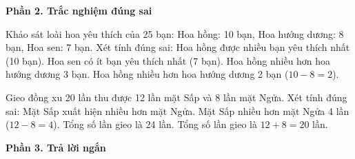 \textbf{Phần 2. Trắc nghiệm đúng sai}

\begin{ex} %
Khảo sát loài hoa yêu thích của 25 bạn: Hoa hồng: 10 bạn, Hoa hướng dương: 8 bạn, Hoa sen: 7 bạn. Xét tính đúng sai:
\choiceTF
{\True Hoa hồng được nhiều bạn yêu thích nhất (10 bạn).}
{\True Hoa sen có ít bạn yêu thích nhất (7 bạn).}
{Hoa hồng nhiều hơn hoa hướng dương 3 bạn.}
{\True Hoa hồng nhiều hơn hoa hướng dương 2 bạn ($10 - 8 = 2$).}
\end{ex}

\begin{ex} %
Gieo đồng xu 20 lần thu được 12 lần mặt Sấp và 8 lần mặt Ngửa. Xét tính đúng sai:
\choiceTF
{\True Mặt Sấp xuất hiện nhiều hơn mặt Ngửa.}
{\True Mặt Sấp nhiều hơn mặt Ngửa 4 lần ($12 - 8 = 4$).}
{Tổng số lần gieo là 24 lần.}
{\True Tổng số lần gieo là $12 + 8 = 20$ lần.}
\end{ex}

\textbf{Phần 3. Trả lời ngắn}

